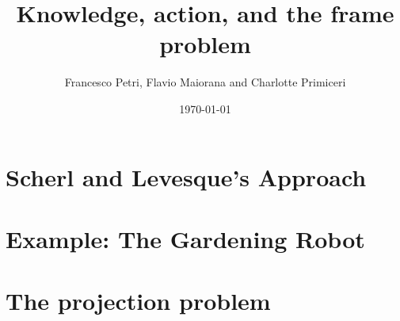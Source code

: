 \documentclass{beamer}
\title{Knowledge, action, and the frame problem}
\author{Francesco Petri, Flavio Maiorana and Charlotte Primiceri}
\date{\today}
\begin{document}
\maketitle


\section{Scherl and Levesque's Approach}



\section{Example: The Gardening Robot}


\section{The projection problem}


\footlinecolor{}

\backmatter
\end{document}
